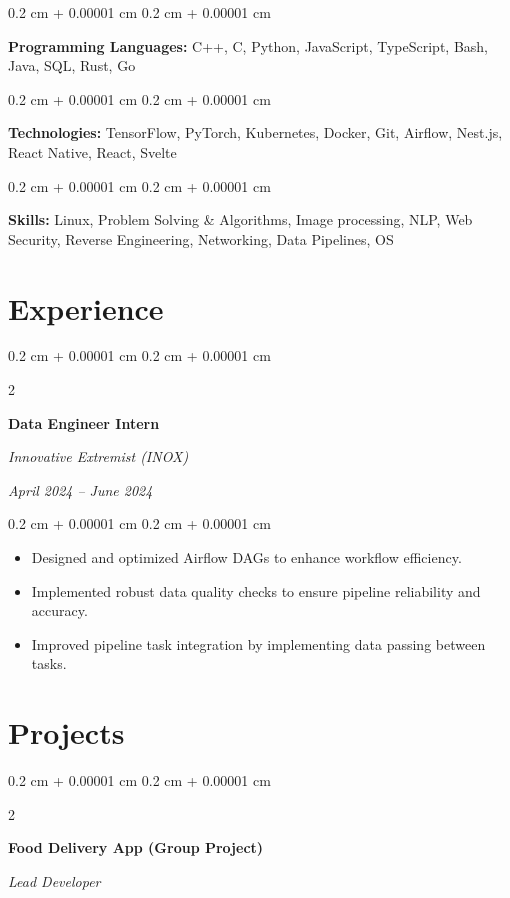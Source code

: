 \documentclass[10pt,letterpaper]{extarticle}
\newenvironment{highlights}{
    \begin{itemize}[
        topsep=0.10 cm,
        parsep=0.10 cm,
        partopsep=0pt,
        itemsep=0pt,
        leftmargin=0.4 cm + 10pt
    ]
}{
    \end{itemize}
} %
\newenvironment{onecolentry}{
    \begin{adjustwidth}{
        0.2 cm + 0.00001 cm
    }{
        0.2 cm + 0.00001 cm
    }
}{
    \end{adjustwidth}
} %
\newenvironment{twocolentry}[2][]{
    \onecolentry
    \def\secondColumn{#2}
    \setcolumnwidth{\fill, 5.0 cm}
    \begin{paracol}{2}
}{
    \switchcolumn \raggedleft \secondColumn
    \end{paracol}
    \endonecolentry
} %
\begin{document}
        \begin{onecolentry}
            \textbf{Programming Languages:} C++, C, Python, JavaScript, TypeScript, Bash, Java, SQL, Rust, Go
        \end{onecolentry}


        \begin{onecolentry}
            \textbf{Technologies:} TensorFlow, PyTorch, Kubernetes, Docker, Git, Airflow, Nest.js, React Native, React, Svelte
        \end{onecolentry}


        \begin{onecolentry}
            \textbf{Skills:} Linux, Problem Solving \& Algorithms, Image processing, NLP, Web Security, Reverse Engineering, Networking, Data Pipelines, OS
        \end{onecolentry}

    \section{Experience}

        \begin{twocolentry}{
            \textit{April 2024 – June 2024}}
            \textbf{Data Engineer Intern}

            \textit{Innovative Extremist (INOX)}
        \end{twocolentry}

        \vspace{0.10 cm}
        \begin{onecolentry}
            \begin{highlights}
                \item Designed and optimized Airflow DAGs to enhance workflow efficiency.
                \item Implemented robust data quality checks to ensure pipeline reliability and accuracy.
                \item Improved pipeline task integration by implementing data passing between tasks.
            \end{highlights}
        \end{onecolentry}
    
        \section{Projects}

        \begin{twocolentry}{
            \textit{Lead Developer}}
            \textbf{Food Delivery App (Group Project)}
        \end{twocolentry}
\end{document}
